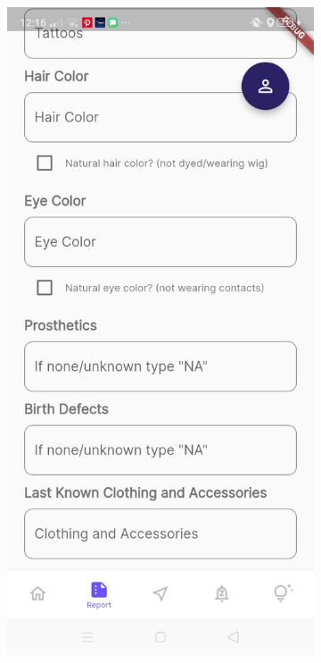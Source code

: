 \begin{figure}[!h]
\begin{subfigure}[c]{0.40\linewidth}
    \end{subfigure}
    \centering
    \begin{subfigure}[c]{0.40\linewidth}
        \centering
        \includegraphics[scale=0.15]{figures/Chapter4/Main/p4-2.jpg}

\end{subfigure}
\end{figure}
